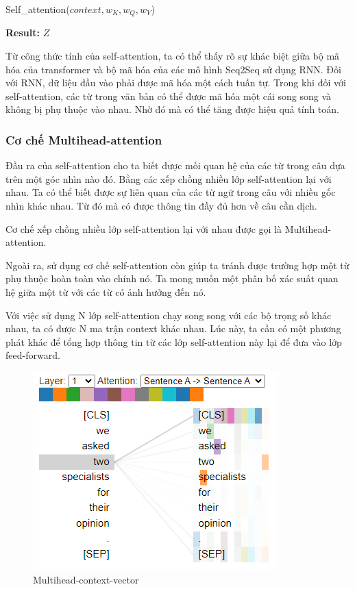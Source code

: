 \begin{algorithm}[H]
    \caption{Self\_attention($context, w_K, w_Q, w_V$)}
    \begin{algorithmic}[1]
		\State \textbf{Result:} $Z$
    \end{algorithmic}
\end{algorithm}

Từ công thức tính của self-attention, ta có thể thấy rõ sự khác biệt giữa bộ mã hóa của transformer và bộ mã hóa của các mô hình Seq2Seq sử dụng RNN. Đối với RNN, dữ liệu đầu vào phải được mã hóa một cách tuần tự. Trong khi đối với self-attention, các từ trong văn bản có thể được mã hóa một cái song song và không bị phụ thuộc vào nhau. Nhờ đó mà có thể tăng được hiệu quả tính toán.

\subsubsection{Cơ chế Multihead-attention}
Đầu ra của self-attention cho ta biết được mối quan hệ của các từ trong câu dựa trên một góc nhìn nào đó. Bằng các xếp chồng nhiều lớp self-attention lại với nhau. Ta có thể biết được sự liên quan của các từ ngữ trong câu với nhiều gốc nhìn khác nhau. Từ đó mà có được thông tin đầy đủ hơn về câu cần dịch. 

Cơ chế xếp chồng nhiều lớp self-attention lại với nhau được gọi là Multihead-attention. 

Ngoài ra, sử dụng cơ chế self-attention còn giúp ta tránh được trường hợp một từ phụ thuộc hoàn toàn vào chính nó. Ta mong muốn một phân bố xác suất quan hệ giữa một từ với các từ có ảnh hưởng đến nó.

Với việc sử dụng N lớp self-attention chạy song song với các bộ trọng số khác nhau, ta có được N ma trận context khác nhau. Lúc này, ta cần có một phương phát khác để tổng hợp thông tin từ các lớp self-attention này lại để đưa vào lớp feed-forward. 

\begin{figure}[H]
    \begin{center}
        \includegraphics[scale=0.8]{images/multihead-context-vector}
        \caption{Multihead-context-vector}
        \label{fig:softmax-func}
    \end{center}
\end{figure}

